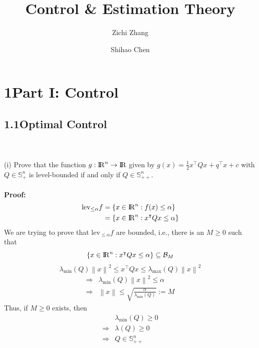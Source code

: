 \documentclass[a4paper,11pt,reqno]{amsart}
\title[ELE8088 Coursework]{Control \& Estimation Theory}
\author[Z. Zhang]{Zichi Zhang}
\author[S. Chen]{Shihao Chen}
\newcommand{\R}{{\rm I\!R}}
\newcommand{\tran}{\intercal}
\begin{document}
\maketitle



\section*{\Large\textbf{1\quad Part I: Control}}


\subsection*{1.1\quad Optimal Control}\label{sec:q1}
\
\\ \\
(i) Prove that the function $g:\R^n\to \R$ given by $g(x) = \frac{1}{2}x^{\tran}Qx+q^{\tran}x+c$ with $Q\in \mathbb{S}^n_+$ is level-bounded
if and only if $Q\in \mathbb{S}^n_{++}$.
\\ \\
\textbf{Proof:}
\begin{align}
    \mathrm{lev}_{\leq \alpha}f&=\{x\in\R^n:f(x)\leq\alpha\}\notag\\
    &=\{x\in\R^n:x^{\tran}Qx\leq\alpha\}
\end{align}
We are trying to prove that $\mathrm{lev}_{\leq \alpha}f$ are bounded, i.e., there is an $M\geq 0$ such that
\begin{equation}
    \{x\in\R^n:x^{\tran}Qx\leq\alpha\}\subseteq \mathcal{B}_M
\end{equation}
\begin{equation}
    \lambda_{\mathrm{min}}(Q)\left\lVert x\right\rVert ^2\leq x^{\tran}Qx\leq \lambda_{\mathrm{max}}(Q)\left\lVert x\right\rVert ^2
\end{equation}
\begin{align}
    \Longrightarrow &\lambda_{\mathrm{min}}(Q)\left\lVert x\right\rVert ^2\leq \alpha\\
    \Longrightarrow &\left\lVert x\right\rVert \leq \sqrt{\frac{\alpha}{\lambda_{\mathrm{min}}(Q)}}:=M
\end{align}
Thus, if $M\geq 0$ exists, then
\begin{align}
    &\lambda_{\mathrm{min}}(Q)\geq 0\\
    \Longrightarrow&\lambda(Q)\geq 0\\
    \Longrightarrow &Q\in \mathbb{S}^n_{++}
\end{align}
\end{document}
